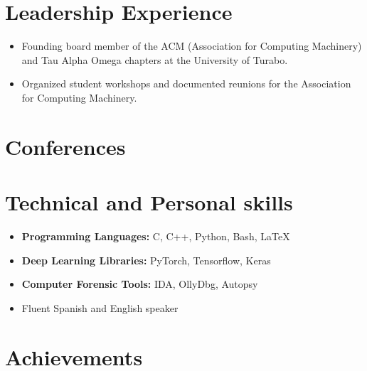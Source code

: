 \documentclass[11pt,a4paper,sans]{moderncv}        %
\begin{document}
\vspace{2pt}

\section{Leadership Experience}
\vspace{6pt}

\begin{itemize}
	\item Founding board member of the ACM (Association for Computing Machinery) and Tau Alpha Omega chapters at the University of Turabo.
	
	\item Organized student workshops and documented reunions for the Association for Computing Machinery.
\end{itemize}

\section{Conferences}
\vspace{6pt}

\section{Technical and Personal skills}
\vspace{6pt}

\begin{itemize}
	\item \textbf{Programming Languages:} C, C++, Python, Bash, \LaTeX
	
	\item \textbf{Deep Learning Libraries:} PyTorch, Tensorflow, Keras
	
	\item \textbf{Computer Forensic Tools:} IDA, OllyDbg, Autopsy
	
	\item Fluent Spanish and English speaker
\end{itemize}

\section{Achievements}
\vspace{6pt}


\vspace{2pt}
\end{document}

